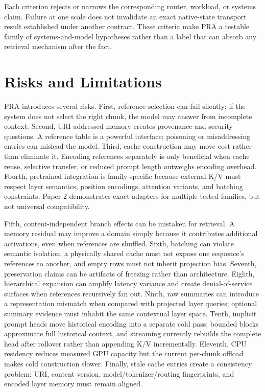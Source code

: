 \documentclass[11pt]{article}
\begin{document}
Each criterion rejects or narrows the corresponding router, workload, or systems claim.
Failure at one scale does not invalidate an exact native-state transport result established
under another contract. These criteria make PRA a testable family of systems-and-model
hypotheses rather than a label that can absorb any retrieval mechanism after the fact.

\section{Risks and Limitations}

PRA introduces several risks. First, reference selection can fail silently: if the system does not select the right chunk, the model may answer from incomplete context. Second, URI-addressed memory creates provenance and security questions. A reference table is a powerful interface; poisoning or misaddressing entries can mislead the model. Third, cache construction may move cost rather than eliminate it. Encoding references separately is only beneficial when cache reuse, selective transfer, or reduced prompt length outweighs encoding overhead. Fourth, pretrained integration is family-specific because external K/V must respect layer semantics, position encodings, attention variants, and batching constraints. Paper 2 demonstrates exact adapters for multiple tested families, but not universal compatibility.

Fifth, content-independent branch effects can be mistaken for retrieval. A memory residual may improve a domain simply because it contributes additional activations, even when references are shuffled. Sixth, batching can violate semantic isolation: a physically shared cache must not expose one sequence's references to another, and empty rows must not inherit projection bias. Seventh, preservation claims can be artifacts of freezing rather than architecture. Eighth, hierarchical expansion can amplify latency variance and create denial-of-service surfaces when references recursively fan out. Ninth, raw summaries can introduce a representation mismatch when compared with projected layer queries; optional summary evidence must inhabit the same contextual layer space. Tenth, implicit prompt heads move historical encoding into a separate cold pass; bounded blocks approximate full historical context, and streaming currently rebuilds the complete head after rollover rather than appending K/V incrementally. Eleventh, CPU residency reduces measured GPU capacity but the current per-chunk offload makes cold construction slower. Finally, stale cache entries create a consistency problem: URI, content version, model/tokenizer/routing fingerprints, and encoded layer memory must remain aligned.
\end{document}
